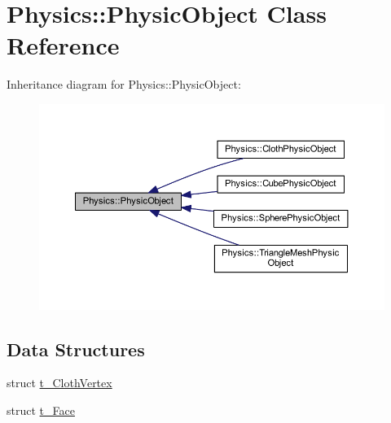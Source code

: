 \hypertarget{class_physics_1_1_physic_object}{}\section{Physics\+:\+:Physic\+Object Class Reference}
\label{class_physics_1_1_physic_object}


Inheritance diagram for Physics\+:\+:Physic\+Object\+:
\nopagebreak
\begin{figure}[H]
\begin{center}
\leavevmode
\includegraphics[width=350pt]{class_physics_1_1_physic_object__inherit__graph}
\end{center}
\end{figure}
\subsection*{Data Structures}
\begin{DoxyCompactItemize}
\item 
struct \hyperlink{struct_physics_1_1_physic_object_1_1t___cloth_vertex}{t\+\_\+\+Cloth\+Vertex}
\item 
struct \hyperlink{struct_physics_1_1_physic_object_1_1t___face}{t\+\_\+\+Face}
\end{DoxyCompactItemize}
